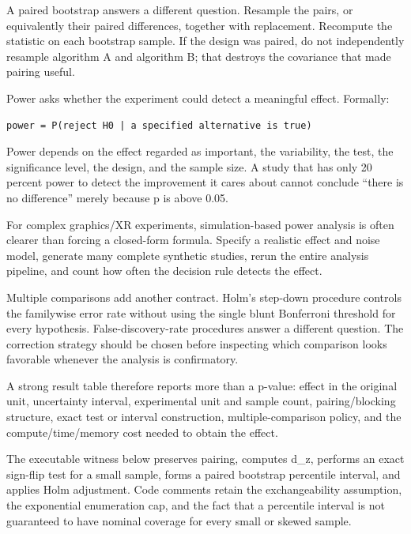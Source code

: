 A paired bootstrap answers a different question. Resample the pairs, or equivalently their paired differences, together with replacement. Recompute the statistic on each bootstrap sample. If the design was paired, do not independently resample algorithm A and algorithm B; that destroys the covariance that made pairing useful.

Power asks whether the experiment could detect a meaningful effect. Formally:

\begin{verbatim}
power = P(reject H0 | a specified alternative is true)
\end{verbatim}

Power depends on the effect regarded as important, the variability, the test, the significance level, the design, and the sample size. A study that has only 20 percent power to detect the improvement it cares about cannot conclude ``there is no difference'' merely because p is above 0.05.

For complex graphics/XR experiments, simulation-based power analysis is often clearer than forcing a closed-form formula. Specify a realistic effect and noise model, generate many complete synthetic studies, rerun the entire analysis pipeline, and count how often the decision rule detects the effect.

Multiple comparisons add another contract. Holm's step-down procedure controls the familywise error rate without using the single blunt Bonferroni threshold for every hypothesis. False-discovery-rate procedures answer a different question. The correction strategy should be chosen before inspecting which comparison looks favorable whenever the analysis is confirmatory.

A strong result table therefore reports more than a p-value: effect in the original unit, uncertainty interval, experimental unit and sample count, pairing/blocking structure, exact test or interval construction, multiple-comparison policy, and the compute/time/memory cost needed to obtain the effect.

The executable witness below preserves pairing, computes d\_z, performs an exact sign-flip test for a small sample, forms a paired bootstrap percentile interval, and applies Holm adjustment. Code comments retain the exchangeability assumption, the exponential enumeration cap, and the fact that a percentile interval is not guaranteed to have nominal coverage for every small or skewed sample.

